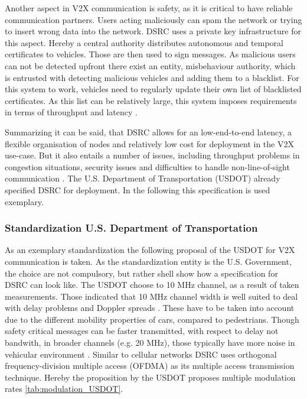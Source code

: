 \documentclass[conference,12pt,onecolumn]{IEEEtran}
\begin{document}
Another aspect in V2X communication is safety, as it is critical to have reliable communication partners. Users acting maliciously can spam the network or trying to insert wrong data into the network. DSRC uses a private key infrastructure for this aspect. Hereby a central authority distributes autonomous and temporal certificates to vehicles. Those are then used to sign messages. As malicious users can not be detected upfront there exist an entity, misbehaviour authority, which is entrusted with detecting malicious vehicles and adding them to a blacklist. For this system to work, vehicles need to regularly update their own list of blacklisted certificates. As this list can be relatively large, this system imposes requirements in terms of throughput and latency \cite{machardy2018}.

Summarizing it can be said, that DSRC allows for an low-end-to-end latency, a flexible organisation of nodes and relatively low cost for deployment in the V2X use-case. But it also entails a number of issues, including throughput problems in congestion situations, security issues and difficulties to handle non-line-of-sight communication \cite{machardy2018}. The U.S. Department of Transportation (USDOT) already specified DSRC for deployment. In the following this specification is used exemplary.

\subsubsection*{Standardization U.S. Department of Transportation}
As an exemplary standardization the following proposal of the USDOT for V2X communication is taken. As the standardization entity is the U.S. Government, the choice are not compulsory, but rather shell show how a specification for DSRC can look like.
The USDOT choose to 10 MHz channel, as a result of taken measurements. Those indicated that 10 MHz channel width is well suited to deal with delay problems and Doppler spreads \cite{kenney2011}. These have to be taken into account due to the different mobility properties of cars, compared to pedestrians.  Though safety critical messages can be faster transmitted, with respect to delay not bandwith, in broader channels (e.g. 20 MHz), those typically have more noise in vehicular environment \cite{kenney2011}.
Similar to cellular networks DSRC uses orthogonal frequency-division multiple access (OFDMA) as its multiple access transmission technique. Hereby the proposition by the USDOT proposes multiple modulation rates \ref{tab:modulation_USDOT}.
\end{document}
